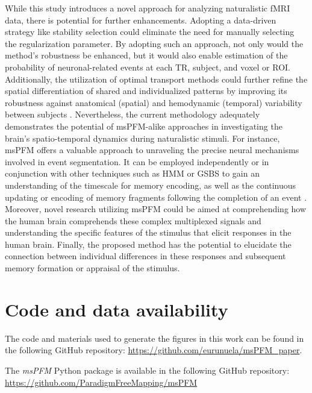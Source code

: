 While this study introduces a novel approach for analyzing naturalistic fMRI
data, there is potential for further enhancements. Adopting a data-driven
strategy like stability selection
\citep{Meinshausen2010Stabilityselection, Urunuela2022Wholebrainmultivariate}
could eliminate the need for manually selecting the regularization parameter. By
adopting such an approach, not only would the method's robustness be enhanced,
but it would also enable estimation of the probability of neuronal-related
events at each TR, subject, and voxel or ROI. Additionally, the utilization of
optimal transport methods could further refine the spatial differentiation of
shared and individualized patterns by improving its robustness against
anatomical (spatial) and hemodynamic (temporal) variability between subjects
\citep{Janati2020MultisubjectMEG/EEG}. Nevertheless, the current methodology
adequately demonstrates the potential of msPFM-alike approaches in investigating
the brain's spatio-temporal dynamics during naturalistic stimuli. For instance,
msPFM offers a valuable approach to unraveling the precise neural mechanisms
involved in event segmentation. It can be employed independently or in
conjunction with other techniques such as HMM or GSBS to gain an
understanding of the timescale for memory encoding, as well as the continuous
updating or encoding of memory fragments following the completion of an event
\citep{Baldassano2017DiscoveringEventStructure,
Silva2019RapidMemoryReactivation}. Moreover, novel research utilizing msPFM
could be aimed at comprehending how the human brain comprehends these complex
multiplexed signals and understanding the specific features of the stimulus that
elicit responses in the human brain. Finally, the proposed method has the
potential to elucidate the connection between individual differences in these
responses and subsequent memory formation or appraisal of the stimulus.

\section{Code and data availability}
\label{sec:multi_subject_github}
The code and materials used to generate the figures in this work can be found in the following
GitHub repository:
\url{https://github.com/eurunuela/msPFM\_paper}.

The \textit{msPFM} Python package is available in the following GitHub repository:
\url{https://github.com/ParadigmFreeMapping/msPFM}

